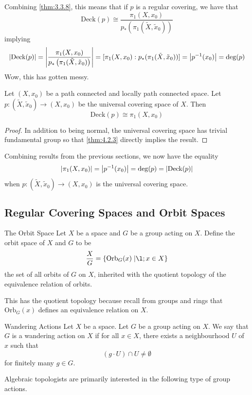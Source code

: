 \documentclass[a4paper]{article}
\begin{document}
Combining \ref{thm:3.3.8}, this means that if $p$ is a regular covering, we have that $$\text{Deck}(p)\cong\frac{\pi_1(X,x_0)}{p_\ast\left(\pi_1(\tilde{X},\tilde{x}_0)\right)}$$ implying $$\abs{\text{Deck}(p)}=\abs{\frac{\pi_1(X,x_0)}{p_\ast\left(\pi_1(\tilde{X},\tilde{x}_0)\right)}}=[\pi_1(X,x_0):p_\ast(\pi_1(\tilde{X},\tilde{x}_0))]=\abs{p^{-1}(x_0)}=\deg(p)$$ Wow, this has gotten messy. 

\begin{crl}{}{} Let $(X,x_0)$ be a path connected and locally path connected space. Let $p:(\tilde{X},\tilde{x}_0)\to(X,x_0)$ be the universal covering space of $X$. Then $$\text{Deck}(p)\cong\pi_1(X,x_0)$$ \tcbline
\begin{proof}
In addition to being normal, the universal covering space has trivial fundamental group so that \ref{thm:4.2.3} directly implies the result. 
\end{proof}
\end{crl}

Combining results from the previous sections, we now have the equality $$\abs{\pi_1(X,x_0)}=\abs{p^{-1}(x_0)}=\deg(p)=\abs{\text{Deck}(p)}$$ when $p:(\tilde{X},\tilde{x}_0)\to(X,x_0)$ is the universal covering space. 

\subsection{Regular Covering Spaces and Orbit Spaces}
\begin{defn}{The Orbit Space}{} Let $X$ be a space and $G$ be a group acting on $X$. Define the orbit space of $X$ and $G$ to be $$\frac{X}{G}=\{\text{Orb}_G(x)\;|\l; x\in X\}$$ the set of all orbits of $G$ on $X$, inherited with the quotient topology of the equivalence relation of orbits. 
\end{defn}

This has the quotient topology because recall from groups and rings that $\text{Orb}_G(x)$ defines an equivalence relation on $X$. 

\begin{defn}{Wandering Actions}{} Let $X$ be a space. Let $G$ be a group acting on $X$. We say that $G$ is a wandering action on $X$ if for all $x\in X$, there exists a neighbourhood $U$ of $x$ such that $$(g\cdot U)\cap U\neq\emptyset$$ for finitely many $g\in G$. 
\end{defn}

Algebraic topologists are primarily interested in the following type of group actions. 
\end{document}

